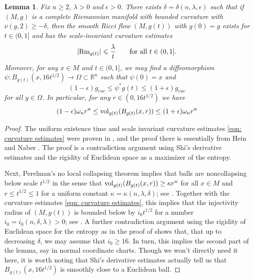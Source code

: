 \documentclass[11pt,reqno]{amsart}
\newtheorem{lemma}[theorem]{Lemma}
\theoremstyle{remark}
\theoremstyle{definition}
\numberwithin{equation}{section}
\newcommand{\R}{{\mathbb{R}}}
\newcommand{\e}{{\epsilon}}
\newcommand{\om}{\omega}
\newcommand{\Rm}{{\rm{Rm}}}
\newcommand{\vol}{{\rm{vol}}}
\begin{document}
\begin{lemma}\label{lemma: initial RF}
Fix $n \geq 2$,  $\lambda>0$ and $\e>0$. There exists $\delta=\delta(n, \lambda,\e)$ such that if $(M, g)$ is a complete Riemannian manifold with bounded curvature with $\nu(g, 2) \geq-\delta$, then the smooth Ricci flow $(M, g(t))$ with $g(0)=g$ exists for $t \in (0,1]$ and has the scale-invariant curvature estimates
\begin{equation}
	\label{eqn: curvature estimates}
|\Rm_{g(t)}| \leqslant \frac{\lambda}{t} \qquad \text{for all }t \in(0,1] .
\end{equation}
Moreover, for
any $x\in M$ and $t\in(0,1]$, we may find a
	diffeomorphism $\psi:B_{g(t)}(x, 16 t^{1/2})\to \Omega\subset \R^n$ such that $\psi(0)=x$ and
\begin{equation}
		(1-\e) g_{euc}  \leq   \psi^*g(t)\leq (1+\e)g_{euc} 
\end{equation}
for all $y\in \Omega$. 
	In particular, 	for any $r\in (0, 16t^{1/2})$ we have	
	\begin{equation}\label{eqn: under reg scale euclidean volumes}
		(1-\e)\om_n r^n \leq \vol_{g(t)}(B_{g(t)}(x,r))\leq(1+\e)\om_n r^n
	\end{equation}
\end{lemma} 
\begin{proof} The uniform existence time and scale invariant curvature estimates \eqref{eqn: curvature estimates} were proven in \cite[Theorem 3.2]{LNN1}, and the proof there is essentially from Hein and Naber \cite{HeinNaber}. The proof is a contradiction argument using  Shi's derivative estimates \cite{ShiExistence} and the rigidity of Euclidean space as a maximizer of the entropy.

Next, Perelman's no local collapsing theorem implies that balls are noncollapsing below scale $t^{1/2}$ in the sense that  $\vol_{g(t)}(B_{g(t)}(x,r)) \geq \kappa r^n$ for all $x \in M$ and $r \leq t^{1/2} \leq1$ for a uniform constant $\kappa= \kappa(n, \lambda, \delta)$; see \cite{perelman2002entropy}. 
Together with the curvature estimates \eqref{eqn: curvature estimates}, this implies that the injectivity radius of $(M,g(t))$ is bounded below by $i_0 t^{1/2}$ for a number $i_0 = i_0(n, \delta, \lambda)>0$; see \cite[Chapter 10, Lemma 53]{petersenBook}.
 A further contradiction argument using the rigidity of Euclidean space for the entropy as in the proof of \cite[Theorem 3.2]{LNN1} shows that, that up to decreasing $\delta$, we may assume that $i_0 \geq 16 $. In turn, this implies the second part of the lemma, say in normal coordinate charts. Though we won't directly need it here, it is worth noting that Shi's derivative estimates actually tell us that $B_{g(t)}(x, 16t^{1/2})$ is smoothly close to a Euclidean ball. 
\end{proof}
\end{document}
